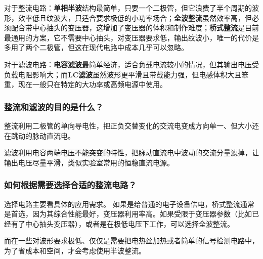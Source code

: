 \documentclass{../../templates/Report}%
\begin{document}
\begin{fullreportonly}
    对于整流电路：\textbf{单相半波}结构最简单，只要一个二极管，但它浪费了半个周期的波形，效率低且纹波大，只适合要求极低的小功率场合；\textbf{全波整流}虽然效率高，但必须配合带中心抽头的变压器，这增加了变压器的体积和制作难度；\textbf{桥式整流}是目前最通用的方案，它不需要中心抽头，对变压器要求低，输出纹波小，唯一的代价是多用了两个二极管，但这在现代电路中成本几乎可以忽略。

    对于滤波电路：\textbf{电容滤波}最简单经济，适合负载电流较小的情况，但其输出电压受负载电阻影响大；而\textbf{LC滤波}虽然波形更平滑且带载能力强，但电感体积大且笨重，现在一般只在特定的大功率或高频电源中使用。

    \subsubsection{整流和滤波的目的是什么？}

    整流利用二极管的单向导电性，把正负交替变化的交流电变成方向单一、但大小还在跳动的脉动直流电。

    滤波利用电容两端电压不能突变的特性，把脉动直流电中波动的交流分量滤掉，让输出电压尽量平滑，类似实验室常用的恒稳直流电源。

    \subsubsection{如何根据需要选择合适的整流电路？}

    选择电路主要看具体的应用需求。
    如果是给普通的电子设备供电，桥式整流通常是首选，因为其综合性能最好，变压器利用率高。如果受限于变压器参数（比如已经有了中心抽头变压器），或者是在极低电压下工作，可以选择全波整流。

    而在一些对波形要求极低、仅仅是需要把电热丝加热或者简单的信号检测电路中，为了省成本和空间，才会考虑使用半波整流。
\end{fullreportonly}
\insertnotes
\end{document}
